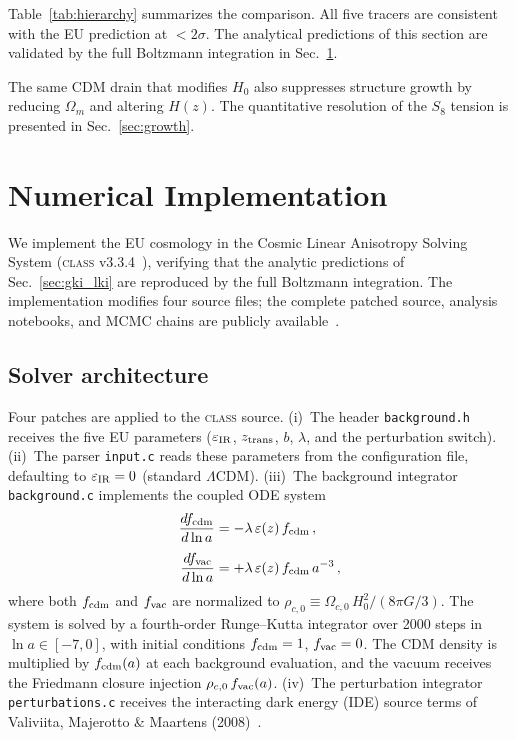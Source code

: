 \documentclass[a4paper,fleqn]{cas-dc}
\newcommand{\eps}{\varepsilon}
\newcommand{\ztrans}{z_{\rm trans}}
\begin{document}
Table~\ref{tab:hierarchy} summarizes the comparison. All five
tracers are consistent with the EU prediction at $< 2\sigma$.
The analytical predictions of this section
are validated by the full Boltzmann integration in
Sec.~\ref{sec:class_implementation}.

The same CDM drain that modifies $H_0$ also suppresses structure
growth by reducing $\Omega_m$ and altering $H(z)$. The
quantitative resolution of the $S_8$ tension is presented in
Sec.~\ref{sec:growth}.

\FloatBarrier
\section{Numerical Implementation}
\label{sec:class_implementation}

We implement the EU cosmology in the Cosmic Linear Anisotropy
Solving System (\textsc{class}
v3.3.4~\cite{blas2011}), verifying that the analytic
predictions of Sec.~\ref{sec:gki_lki} are reproduced by the
full Boltzmann integration. The implementation modifies four
source files; the complete patched source, analysis notebooks,
and MCMC chains are publicly
available~\cite{eu_github}.

\subsection{Solver architecture}
\label{sec:solver}

Four patches are applied to the \textsc{class} source. (i)~The
header \texttt{background.h} receives the five EU parameters
($\varepsilon_{\rm IR}$, $\ztrans$, $b$, $\lambda$,
and the perturbation switch). (ii)~The parser \texttt{input.c}
reads these parameters from the configuration file, defaulting
to $\varepsilon_{\rm IR} = 0$ (standard $\Lambda$CDM).
(iii)~The background integrator \texttt{background.c} implements
the coupled ODE system
\begin{align}
\frac{d f_{\rm cdm}}{d\ln a}
  &= -\lambda\,\eps(z)\,f_{\rm cdm}\,,
\label{eq:fcdm_ode}\\[4pt]
\frac{d f_{\rm vac}}{d\ln a}
  &= +\lambda\,\eps(z)\,f_{\rm cdm}\,a^{-3}\,,
\label{eq:fvac_ode}
\end{align}
where both $f_{\rm cdm}$ and $f_{\rm vac}$ are normalized to
$\rho_{c,0} \equiv \Omega_{c,0}\,H_0^2/(8\pi G/3)$.
The system is solved by a fourth-order Runge--Kutta integrator
over 2000 steps in $\ln a \in [-7, 0]$, with initial conditions
$f_{\rm cdm} = 1$, $f_{\rm vac} = 0$.
The CDM density is multiplied by $f_{\rm cdm}(a)$ at each
background evaluation, and the vacuum receives the Friedmann
closure injection $\rho_{c,0}\,f_{\rm vac}(a)$.
(iv)~The perturbation integrator \texttt{perturbations.c}
receives the interacting dark energy (IDE) source terms
of Valiviita, Majerotto \& Maartens (2008)~\cite{valiviita2008}.
\end{document}
